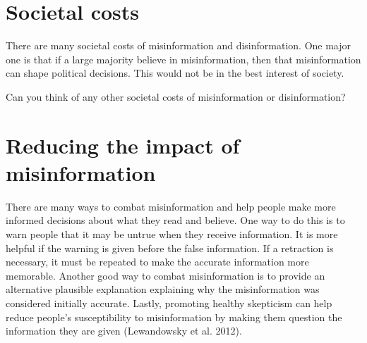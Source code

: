 \documentclass[
  letterpaper,
  DIV=11,
  numbers=noendperiod]{scrreprt}
\begin{document}
\section{Societal costs}\label{societal-costs}

There are many societal costs of misinformation and disinformation. One
major one is that if a large majority believe in misinformation, then
that misinformation can shape political decisions. This would not be in
the best interest of society.

\begin{tcolorbox}[enhanced jigsaw, arc=.35mm, bottomrule=.15mm, bottomtitle=1mm, breakable, colback=white, colbacktitle=quarto-callout-tip-color!10!white, colframe=quarto-callout-tip-color-frame, coltitle=black, left=2mm, leftrule=.75mm, opacityback=0, opacitybacktitle=0.6, rightrule=.15mm, title=\textcolor{quarto-callout-tip-color}{\faLightbulb}\hspace{0.5em}{Pause and Reflect}, titlerule=0mm, toprule=.15mm, toptitle=1mm]

Can you think of any other societal costs of misinformation or
disinformation?

\end{tcolorbox}

\section{Reducing the impact of
misinformation}\label{reducing-the-impact-of-misinformation}

There are many ways to combat misinformation and help people make more
informed decisions about what they read and believe. One way to do this
is to warn people that it may be untrue when they receive information.
It is more helpful if the warning is given before the false information.
If a retraction is necessary, it must be repeated to make the accurate
information more memorable. Another good way to combat misinformation is
to provide an alternative plausible explanation explaining why the
misinformation was considered initially accurate. Lastly, promoting
healthy skepticism can help reduce people's susceptibility to
misinformation by making them question the information they are given
(Lewandowsky et al. 2012).
\end{document}
